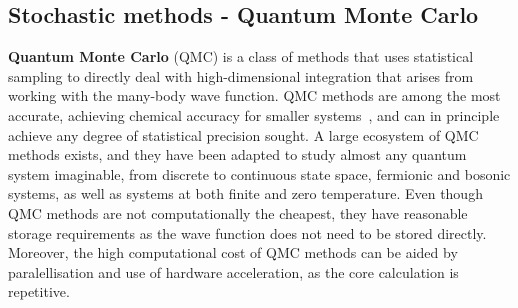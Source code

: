 \subsection{Stochastic methods - Quantum Monte Carlo}
\label{subsec:qmc-overview}
\textbf{Quantum Monte Carlo} (QMC) is a class of methods that uses statistical sampling to directly deal with high-dimensional integration that arises from working with the many-body wave function. QMC methods are among the most accurate, achieving chemical accuracy for smaller systems~\cite{foulkes2001quantum}, and can in principle achieve any degree of statistical precision sought. A large ecosystem of QMC methods exists, and they have been adapted to study almost any quantum system imaginable, from discrete to continuous state space, fermionic and bosonic systems, as well as systems at both finite and zero temperature. Even though QMC methods are not computationally the cheapest, they have reasonable storage requirements as the wave function does not need to be stored directly. Moreover, the high computational cost of QMC methods can be aided by paralellisation and use of hardware acceleration, as the core calculation is repetitive.

